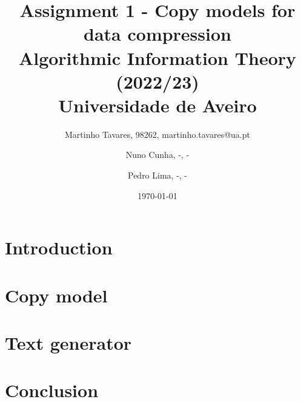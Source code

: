 \documentclass{article}
\begin{document}
\title{
    Assignment 1 - Copy models for data compression \\
    \large{Algorithmic Information Theory (2022/23) \\
    Universidade de Aveiro}
}

\author{
    Martinho Tavares, 98262, martinho.tavares@ua.pt \and
    Nuno Cunha, -, - \and
    Pedro Lima, -, -
}

\maketitle
\date{\today}

\section{Introduction}

\section{Copy model}

\section{Text generator}

\section{Conclusion}

% 
% 
\end{document}
